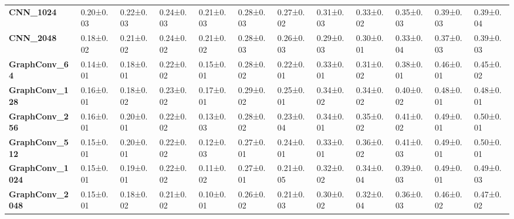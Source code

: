\begin{tabular}{llllllllllll}
\textbf{CNN\_1024      } &   0.20±0.03 &  0.22±0.03 &  0.24±0.03 &  0.21±0.03 &  0.28±0.03 &  0.27±0.02 &  0.31±0.03 &  0.33±0.02 &  0.35±0.03 &   0.39±0.03 &   0.39±0.04 \\
\textbf{CNN\_2048      } &   0.18±0.02 &  0.21±0.02 &  0.24±0.02 &  0.21±0.02 &  0.28±0.03 &  0.26±0.03 &  0.29±0.03 &  0.30±0.01 &  0.33±0.04 &   0.37±0.03 &   0.39±0.03 \\
\textbf{GraphConv\_64  } &   0.14±0.01 &  0.18±0.01 &  0.22±0.02 &  0.15±0.01 &  0.28±0.02 &  0.22±0.01 &  0.33±0.01 &  0.31±0.02 &  0.38±0.01 &   0.46±0.01 &   0.45±0.02 \\
\textbf{GraphConv\_128 } &   0.16±0.01 &  0.18±0.02 &  0.23±0.02 &  0.17±0.01 &  0.29±0.02 &  0.25±0.01 &  0.34±0.02 &  0.34±0.02 &  0.40±0.02 &   0.48±0.01 &   0.48±0.01 \\
\textbf{GraphConv\_256 } &   0.16±0.01 &  0.20±0.01 &  0.22±0.02 &  0.13±0.03 &  0.28±0.02 &  0.23±0.04 &  0.34±0.01 &  0.35±0.02 &  0.41±0.02 &   0.49±0.01 &   0.50±0.01 \\
\textbf{GraphConv\_512 } &   0.15±0.01 &  0.20±0.01 &  0.22±0.02 &  0.12±0.03 &  0.27±0.01 &  0.24±0.01 &  0.33±0.01 &  0.36±0.02 &  0.41±0.03 &   0.49±0.01 &   0.50±0.01 \\
\textbf{GraphConv\_1024} &   0.15±0.01 &  0.19±0.01 &  0.22±0.02 &  0.11±0.02 &  0.27±0.01 &  0.21±0.05 &  0.32±0.02 &  0.34±0.04 &  0.39±0.03 &   0.49±0.01 &   0.49±0.03 \\
\textbf{GraphConv\_2048} &   0.15±0.01 &  0.18±0.02 &  0.21±0.02 &  0.10±0.01 &  0.26±0.02 &  0.21±0.03 &  0.30±0.02 &  0.32±0.04 &  0.36±0.03 &   0.46±0.02 &   0.47±0.02 \\
\bottomrule
\end{tabular}
